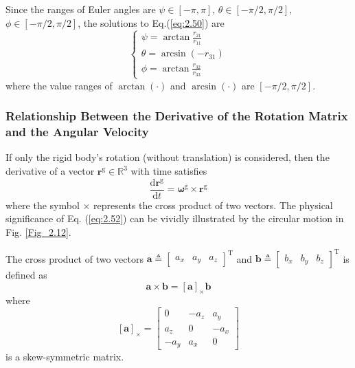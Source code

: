 Since the ranges of Euler angles are $\psi\in\left[-\pi,\pi\right]$,
$\theta\in\left[{-\pi}/{2},{\pi}/{2}\right],$ $\phi\in\left[{-\pi}/{2},{\pi}/{2}\right]$,
the solutions to Eq.(\ref{eq:2.50}) are
\begin{equation}
\left\{ \begin{array}{l}
\psi=\arctan\frac{{{r}_{21}}}{{{r}_{11}}}\\
\theta=\arcsin\left(-{{r}_{31}}\right)\\
\phi=\arctan\frac{{{r}_{32}}}{{{r}_{33}}}
\end{array}\right.\label{eq:2.51}
\end{equation}
where the value ranges of $\arctan\left(\cdot\right)$ and $\arcsin\left(\cdot\right)$
are $\left[{-\pi}/{2},{\pi}/{2}\right]$. 

\subsubsection{Relationship Between the Derivative of the Rotation Matrix and the
	Angular Velocity}

If only the rigid body\textquoteright s rotation (without translation)
is considered, then the derivative of a vector ${{\mathbf{r}}^{\text{g}}}\in{\mathbb{R}^{3}}$
with time satisfies 
\begin{equation}
\frac{\text{d}{{\mathbf{r}}^{\text{g}}}}{\text{d}t}={{\boldsymbol{\omega}}^{\text{g}}}\times{{\mathbf{r}}^{\text{g}}}\label{eq:2.52}
\end{equation}
where the symbol $\times$ represents the cross product of two vectors.
The physical significance of Eq. (\ref{eq:2.52}) can be vividly illustrated
by the circular motion in Fig. \ref{Fig_2.12}. 

The cross product of two vectors $\mathbf{a}\triangleq[\begin{array}{ccc}
a_{x} & {{a}_{y}} & {{a}_{z}}\end{array}]^{\text{T}}$ and $\mathbf{b}\triangleq[\begin{array}{ccc}
b_{x} & {{b}_{y}} & {{b}_{z}}\end{array}]^{\text{T}}$ is defined as \cite{murray2017mathematical}
\begin{equation}
\mathbf{a}\times\mathbf{b}\mathsf{=}{{\left[\mathbf{a}\right]}_{\times}}\mathbf{b}\label{eq:2.53}
\end{equation}
where 
\begin{equation}
{{\left[\mathbf{a}\right]}_{\times}}=\left[\begin{array}{ccc}
0 & -{{a}_{z}} & {{a}_{y}}\\
{{a}_{z}} & 0 & -{{a}_{x}}\\
-{{a}_{y}} & {{a}_{x}} & 0
\end{array}\right]\label{eq:2.54}
\end{equation}
is a skew-symmetric matrix. 

